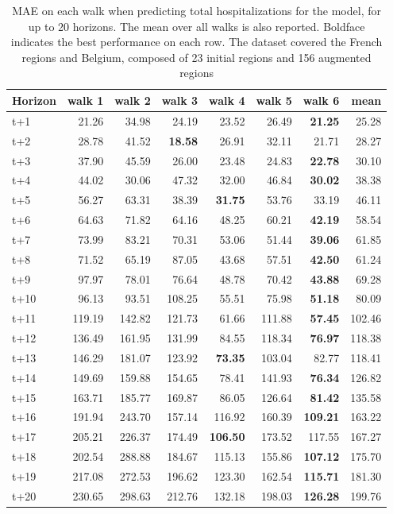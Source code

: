 \begin{table}[H]
\centering
\caption{MAE on each walk when predicting total hospitalizations for the model, for up to 20 horizons. The mean over all walks is also reported. Boldface indicates the best performance on each row. The dataset covered the French regions and Belgium, composed of 23 initial regions and 156 augmented regions }
\label{tab:MAE_walk_dense_model}
\begin{tabular}{lrrrrrrr}
\toprule
Horizon &  walk 1 &  walk 2 &  walk 3 &  walk 4 &  walk 5 &  walk 6 &   mean \\
\midrule
t+1  & 21.26  & 34.98  & 24.19  & 23.52  & 26.49  & \textbf{21.25}  & 25.28  \\
t+2  & 28.78  & 41.52  & \textbf{18.58}  & 26.91  & 32.11  & 21.71  & 28.27  \\
t+3  & 37.90  & 45.59  & 26.00  & 23.48  & 24.83  & \textbf{22.78}  & 30.10  \\
t+4  & 44.02  & 30.06  & 47.32  & 32.00  & 46.84  & \textbf{30.02}  & 38.38  \\
t+5  & 56.27  & 63.31  & 38.39  & \textbf{31.75}  & 53.76  & 33.19  & 46.11  \\
t+6  & 64.63  & 71.82  & 64.16  & 48.25  & 60.21  & \textbf{42.19}  & 58.54  \\
t+7  & 73.99  & 83.21  & 70.31  & 53.06  & 51.44  & \textbf{39.06}  & 61.85  \\
t+8  & 71.52  & 65.19  & 87.05  & 43.68  & 57.51  & \textbf{42.50}  & 61.24  \\
t+9  & 97.97  & 78.01  & 76.64  & 48.78  & 70.42  & \textbf{43.88}  & 69.28  \\
t+10  & 96.13  & 93.51  & 108.25  & 55.51  & 75.98  & \textbf{51.18}  & 80.09  \\
t+11  & 119.19  & 142.82  & 121.73  & 61.66  & 111.88  & \textbf{57.45}  & 102.46  \\
t+12  & 136.49  & 161.95  & 131.99  & 84.55  & 118.34  & \textbf{76.97}  & 118.38  \\
t+13  & 146.29  & 181.07  & 123.92  & \textbf{73.35}  & 103.04  & 82.77  & 118.41  \\
t+14  & 149.69  & 159.88  & 154.65  & 78.41  & 141.93  & \textbf{76.34}  & 126.82  \\
t+15  & 163.71  & 185.77  & 169.87  & 86.05  & 126.64  & \textbf{81.42}  & 135.58  \\
t+16  & 191.94  & 243.70  & 157.14  & 116.92  & 160.39  & \textbf{109.21}  & 163.22  \\
t+17  & 205.21  & 226.37  & 174.49  & \textbf{106.50}  & 173.52  & 117.55  & 167.27  \\
t+18  & 202.54  & 288.88  & 184.67  & 115.13  & 155.86  & \textbf{107.12}  & 175.70  \\
t+19  & 217.08  & 272.53  & 196.62  & 123.30  & 162.54  & \textbf{115.71}  & 181.30  \\
t+20  & 230.65  & 298.63  & 212.76  & 132.18  & 198.03  & \textbf{126.28}  & 199.76  \\

\bottomrule
\end{tabular}
\end{table}

